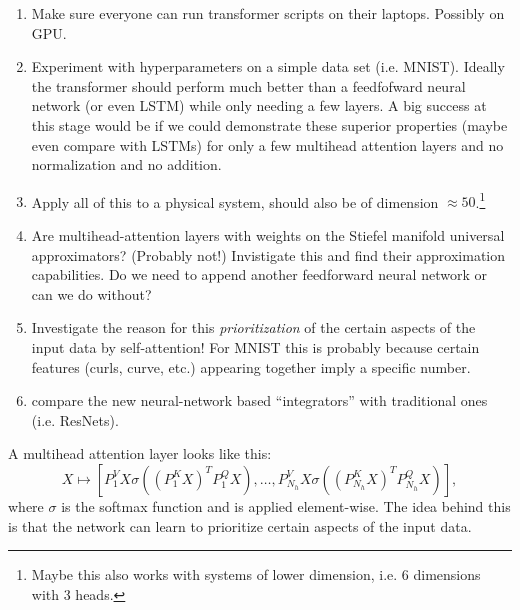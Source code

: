 \documentclass{article}
\begin{document}
\begin{enumerate}
    \item Make sure everyone can run transformer scripts on their laptops. Possibly on GPU. 
    
    \item Experiment with hyperparameters on a simple data set (i.e. MNIST). Ideally the transformer should perform much better than a feedfofward neural network (or even LSTM) while only needing a few layers. 
        A big success at this stage would be if we could demonstrate these superior properties (maybe even compare with LSTMs) for only a few multihead attention layers and no normalization and no addition. 
    
    \item Apply all of this to a physical system, should also be of dimension $\approx50$.\footnote{Maybe this also works with systems of lower dimension, i.e. 6 dimensions with 3 heads.}

    \item Are multihead-attention layers with weights on the Stiefel manifold universal approximators? (Probably not!) Invistigate this and find their approximation capabilities. Do we need to append another feedforward neural network or can we do without?

    \item Investigate the reason for this \textit{prioritization} of the certain aspects of the input data by self-attention! For MNIST this is probably because certain features (curls, curve, etc.) appearing together imply a specific number.

    \item compare the new neural-network based ``integrators'' with traditional ones (i.e. ResNets).
\end{enumerate}

A multihead attention layer looks like this: 
\begin{equation}
    X \mapsto [P^V_1X\sigma((P^K_1X)^TP^Q_1X), \ldots, P^V_{N_h}X\sigma((P^K_{N_h}X)^TP^Q_{N_h}X)],
\end{equation}
where $\sigma$ is the softmax function and is applied element-wise. The idea behind this is that the network can learn to prioritize certain aspects of the input data.
\end{document}
